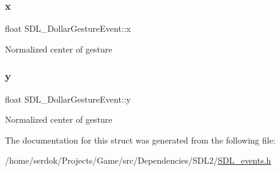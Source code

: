 \subsubsection{\texorpdfstring{x}{x}}
{\footnotesize\ttfamily float S\+D\+L\+\_\+\+Dollar\+Gesture\+Event\+::x}

Normalized center of gesture \mbox{\label{structSDL__DollarGestureEvent_a293b2303acc1cfc63c167c5525e6eab5}} 
\subsubsection{\texorpdfstring{y}{y}}
{\footnotesize\ttfamily float S\+D\+L\+\_\+\+Dollar\+Gesture\+Event\+::y}

Normalized center of gesture 

The documentation for this struct was generated from the following file\+:\begin{DoxyCompactItemize}
\item 
/home/serdok/\+Projects/\+Game/src/\+Dependencies/\+S\+D\+L2/\hyperlink{SDL__events_8h}{S\+D\+L\+\_\+events.\+h}\end{DoxyCompactItemize}
